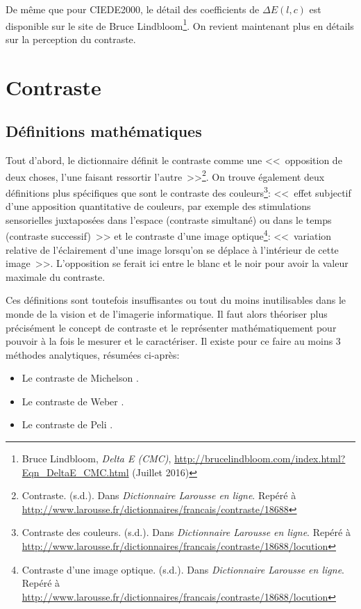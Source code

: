 	\par De même que pour CIEDE2000, le détail des coefficients de $\Delta E(l,c)$ est disponible sur le site de Bruce Lindbloom\footnote{Bruce Lindbloom, \textit{Delta E (CMC)}, \url{http://brucelindbloom.com/index.html?Eqn_DeltaE_CMC.html} (Juillet 2016)}. On revient maintenant plus en détails sur la perception du contraste.

\chapter{Contraste}
	\section{Définitions mathématiques}
	\par Tout d'abord, le dictionnaire définit le contraste comme une <<~opposition de deux choses, l'une faisant ressortir l'autre~>>\footnote{Contraste. (s.d.). Dans \textit{Dictionnaire Larousse en ligne}. Repéré à \url{http://www.larousse.fr/dictionnaires/francais/contraste/18688}}. On trouve également deux définitions plus spécifiques que sont le contraste des couleurs\footnote{Contraste des couleurs. (s.d.). Dans \textit{Dictionnaire Larousse en ligne}. Repéré à \url{http://www.larousse.fr/dictionnaires/francais/contraste/18688/locution}}: <<~effet subjectif d'une apposition quantitative de couleurs, par exemple des stimulations sensorielles juxtaposées dans l'espace (contraste simultané) ou dans le temps (contraste successif)~>> et le contraste d'une image optique\footnote{Contraste d'une image optique. (s.d.). Dans \textit{Dictionnaire Larousse en ligne}. Repéré à \url{http://www.larousse.fr/dictionnaires/francais/contraste/18688/locution}}: <<~variation relative de l'éclairement d'une image lorsqu'on se déplace à l'intérieur de cette image~>>. L'opposition se ferait ici entre le blanc et le noir pour avoir la valeur maximale du contraste.
	
	\par Ces définitions sont toutefois insuffisantes ou tout du moins inutilisables dans le monde de la vision et de l'imagerie informatique. Il faut alors théoriser plus précisément le concept de contraste et le représenter mathématiquement pour pouvoir à la fois le mesurer et le caractériser.
	Il existe pour ce faire au moins 3 méthodes analytiques, résumées ci-après:
	\begin{itemize}
		\item Le contraste de Michelson \citep{michelson_studies_1995,winkler_issues_1999,fuchs_traite_2003}.
		\item Le contraste de Weber \citep{winkler_computing_1999,winkler_issues_1999}.
		\item Le contraste de Peli \citep{peli_contrast_1990,winkler_computing_1999,winkler_issues_1999}.
	\end{itemize}

